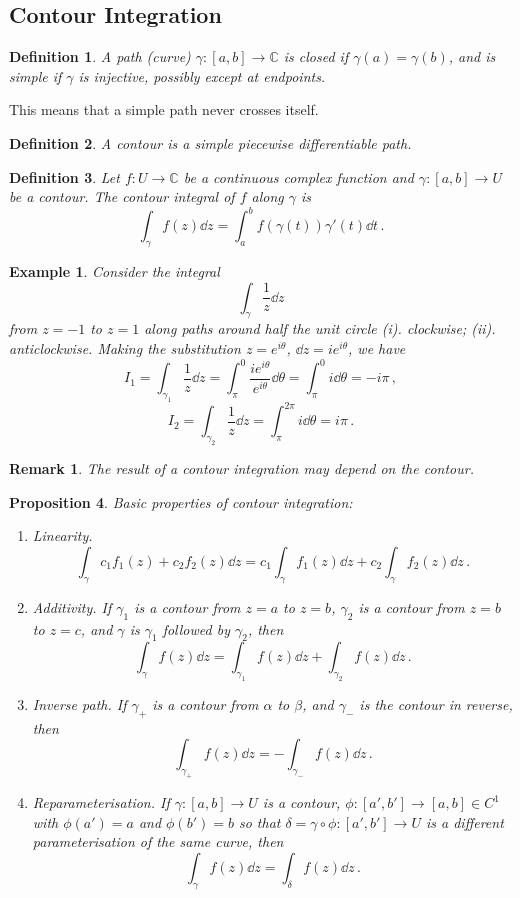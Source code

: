 \documentclass{article}
\theoremstyle{plain}\theoremheaderfont{\normalfont\itshape}\theorembodyfont{\rmfamily}\theoremseparator{.}\newtheorem*{rem}{Remark}\newtheorem*{ex}{Example}\newtheorem*{proof}{Proof}\newtheorem*{altp}{Alternative proof}
\theoremstyle{plain}\theoremheaderfont{\normalfont\bfseries}\theorembodyfont{\rmfamily}\theoremseparator{.}\newtheorem{thm}{Theorem}[section]\newtheorem{lem}[thm]{Lemma}\newtheorem{prop}[thm]{Proposition}\newtheorem*{cor}{Corollary}\newtheorem{defn}[thm]{Definition}\newtheorem{clm}[thm]{Claim}\newtheorem{clminproof}{Claim}
\theoremstyle{break}\theoremheaderfont{\normalfont\itshape}\theorembodyfont{\rmfamily}\theoremseparator{.\medskip}\newtheorem*{proofskip}{Proof}\newtheorem*{exs}{Examples}\newtheorem*{rems}{Remarks}
\theoremstyle{break}\theoremheaderfont{\normalfont\bfseries}\theorembodyfont{\rmfamily}\theoremseparator{.\medskip}\newtheorem{lemskip}[thm]{Lemma}\newtheorem{defnskip}[thm]{Definition}\newtheorem{propskip}[thm]{Proposition}\newtheorem{thmskip}[thm]{Theorem}
\numberwithin{equation}{section}
\begin{document}
	\subsection{Contour Integration}
	\begin{defn}
		A path (curve) \(\gamma:[a,b]\to\mathbb{C}\) is \textit{closed} if \(\gamma(a)=\gamma(b)\), and is \textit{simple} if \(\gamma\) is injective, possibly except at endpoints.
	\end{defn}
	This means that a simple path never crosses itself.
	\begin{defn}
		A \textit{contour} is a simple piecewise differentiable path.
	\end{defn}
	\begin{defn}
		Let \(f:U\to\mathbb{C}\) be a continuous complex function and \(\gamma:[a,b]\to U\) be a contour. The \textit{contour integral} of \(f\) along \(\gamma\) is
		\[\int_\gamma f(z)\dd{z}=\int_{a}^{b}f(\gamma(t))\gamma'(t)\dd{t}\,.\]
	\end{defn}
	\begin{ex}
		Consider the integral
		\[\int_\gamma \frac{1}{z}\dd{z}\]
		from \(z=-1\) to \(z=1\) along paths around half the unit circle (i). clockwise; (ii). anticlockwise. Making the substitution \(z=e^{i\theta}\), \(\dd{z}=ie^{i\theta}\), we have
		\[I_1=\int_{\gamma_1}\frac{1}{z}\dd{z}=\int_{\pi}^{0}\frac{ie^{i\theta}}{e^{i\theta}}\dd{\theta}=\int_{\pi}^{0}i\dd{\theta}=-i\pi\,,\]
		\[I_2=\int_{\gamma_2}\frac{1}{z}\dd{z}=\int_{\pi}^{2\pi}i\dd{\theta}=i\pi\,.\]
	\end{ex}
	\begin{rem}
		The result of a contour integration may depend on the contour.
	\end{rem}
	\begin{prop}
		Basic properties of contour integration:
		\begin{enumerate}[topsep=0pt]
			\item[(i)] \textit{Linearity.}
			\[\int_\gamma c_1f_1(z)+c_2f_2(z)\dd{z}=c_1\int_\gamma f_1(z)\dd{z}+c_2\int_\gamma f_2(z)\dd{z}\,.\]
			\item[(ii)] \textit{Additivity.} If \(\gamma_1\) is a contour from \(z=a\) to \(z=b\), \(\gamma_2\) is a contour from \(z=b\) to \(z=c\), and \(\gamma\) is \(\gamma_1\) followed by \(\gamma_2\), then
			\[\int_\gamma f(z)\dd{z}=\int_{\gamma_1}f(z)\dd{z}+\int_{\gamma_2}f(z)\dd{z}\,.\]
			\item[(iii)] \textit{Inverse path.} If \(\gamma_+\) is a contour from \(\alpha\) to \(\beta\), and \(\gamma_-\) is the contour in reverse, then
			\[\int_{\gamma_+}f(z)\dd{z}=-\int_{\gamma_-}f(z)\dd{z}\,.\]
			\item[(iv)] \textit{Reparameterisation.} If \(\gamma:[a,b]\to U\) is a contour, \(\phi:[a',b']\to[a,b]\in C^1\) with \(\phi(a')=a\) and \(\phi(b')=b\) so that \(\delta=\gamma\circ\phi:[a',b']\to U\) is a different parameterisation of the same curve, then
			\[\int_\gamma f(z)\dd{z}=\int_\delta f(z)\dd{z}\,.\]
		\end{enumerate}
	\end{prop}
\end{document}
